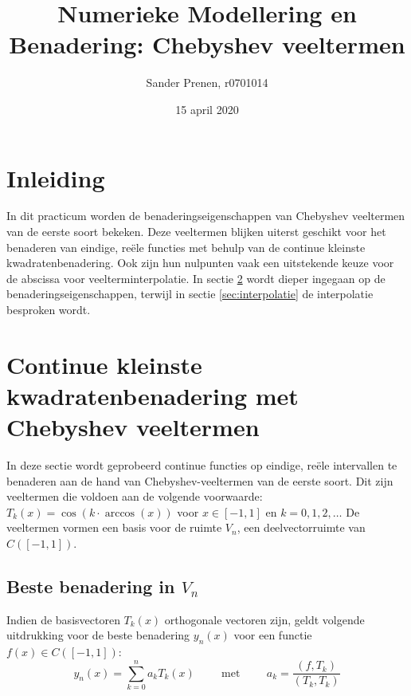 \documentclass[a4paper, 12pt, titlepage, fleqn]{article}
\begin{document}
\title{\textbf{Numerieke Modellering en Benadering: Chebyshev veeltermen}}
\author{Sander Prenen, r0701014}

\date{15 april 2020}
\begin{titlepage}
	\maketitle
	\thispagestyle{empty}
\end{titlepage}

\newpage
\tableofcontents
\listoffigures
\newpage
\section{Inleiding}
In dit practicum worden de benaderingseigenschappen van Chebyshev veeltermen van de eerste soort bekeken. Deze veeltermen blijken uiterst geschikt voor het benaderen van eindige, re\"ele functies met behulp van de continue kleinste kwadratenbenadering. Ook zijn hun nulpunten vaak een uitstekende keuze voor de abscissa voor veelterminterpolatie. In sectie \ref{sec:benadering} wordt dieper ingegaan op de benaderingseigenschappen, terwijl in sectie \ref{sec:interpolatie} de interpolatie besproken wordt.

\section{Continue kleinste kwadratenbenadering met Chebyshev veeltermen}
\label{sec:benadering}
In deze sectie wordt geprobeerd continue functies op eindige, re\"ele intervallen te benaderen aan de hand van Chebyshev-veeltermen van de eerste soort. Dit zijn veeltermen die voldoen aan de volgende voorwaarde: $T_k(x) = \cos(k \cdot \arccos (x))$ voor $x \in [-1,1]$ en $k = 0,1,2,\ldots$ De veeltermen vormen een basis voor de ruimte $V_n$, een deelvectorruimte van $C([-1,1])$. 


\subsection{Beste benadering in $V_n$}
Indien de basisvectoren $T_k(x)$ orthogonale vectoren zijn, geldt volgende uitdrukking voor de beste benadering $y_n(x)$ voor een functie $f(x) \in C([-1,1])$:
\begin{equation}
y_n(x) = \sum_{k=0}^na_kT_k(x) \hspace{1cm} \text{met} \hspace{1cm} a_k = \frac{(f,T_k)}{(T_k,T_k)}
\label{eq:beste_benadering}
\end{equation}
\end{document}

